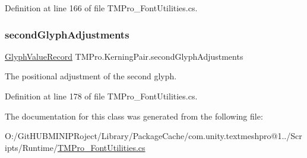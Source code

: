 Definition at line 166 of file T\+M\+Pro\+\_\+\+Font\+Utilities.\+cs.

\mbox{\label{class_t_m_pro_1_1_kerning_pair_a04339cd46e942ce4841397cb801c47d7}} 
\subsubsection{\texorpdfstring{secondGlyphAdjustments}{secondGlyphAdjustments}}
{\footnotesize\ttfamily \mbox{\hyperlink{struct_t_m_pro_1_1_glyph_value_record}{Glyph\+Value\+Record}} T\+M\+Pro.\+Kerning\+Pair.\+second\+Glyph\+Adjustments\hspace{0.3cm}{\ttfamily [get]}}



The positional adjustment of the second glyph. 



Definition at line 178 of file T\+M\+Pro\+\_\+\+Font\+Utilities.\+cs.



The documentation for this class was generated from the following file\+:\begin{DoxyCompactItemize}
\item 
O\+:/\+Git\+H\+U\+B\+M\+I\+N\+I\+P\+Roject/\+Library/\+Package\+Cache/com.\+unity.\+textmeshpro@1../\+Scripts/\+Runtime/\mbox{\hyperlink{_t_m_pro___font_utilities_8cs}{T\+M\+Pro\+\_\+\+Font\+Utilities.\+cs}}\end{DoxyCompactItemize}
